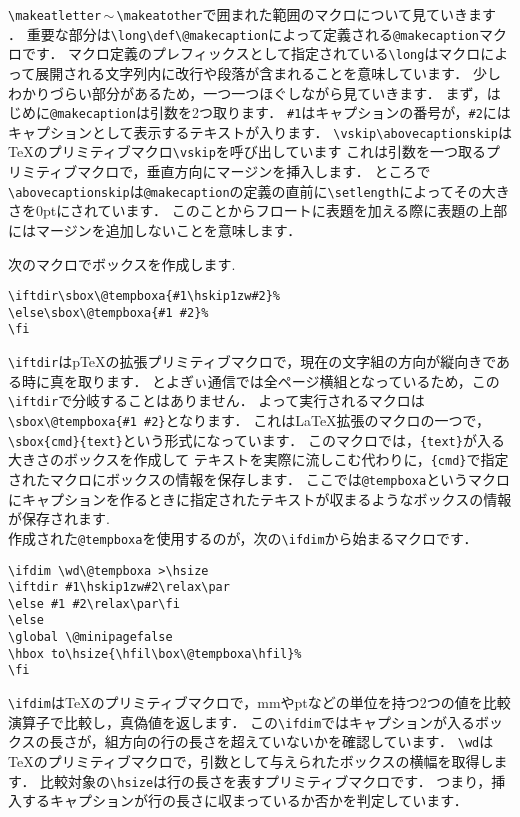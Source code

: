 \verb|\makeatletter|\,$\sim$\,\verb|\makeatother|で囲まれた範囲のマクロについて見ていきます
．
重要な部分は\verb|\long\def\@makecaption|によって定義される\verb|@makecaption|マクロです．
マクロ定義のプレフィックスとして指定されている\verb|\long|はマクロによって展開される文字列内に改行や段落が含まれることを意味しています．
少しわかりづらい部分があるため，一つ一つほぐしながら見ていきます．
まず，はじめに\verb|@makecaption|は引数を2つ取ります．
\verb|#1|はキャプションの番号が，\verb|#2|にはキャプションとして表示するテキストが入ります．
\verb|\vskip\abovecaptionskip|は{\TeX}のプリミティブマクロ\verb|\vskip|を呼び出しています
これは引数を一つ取るプリミティブマクロで，垂直方向にマージンを挿入します．
ところで\verb|\abovecaptionskip|は\verb|@makecaption|の定義の直前に\verb|\setlength|によってその大きさを0ptにされています．
このことからフロートに表題を加える際に表題の上部にはマージンを追加しないことを意味します．

次のマクロでボックスを作成します.
\begin{verbatim}
\iftdir\sbox\@tempboxa{#1\hskip1zw#2}%
\else\sbox\@tempboxa{#1 #2}%
\fi
\end{verbatim}%
\verb|\iftdir|は{p\TeX}の拡張プリミティブマクロで，現在の文字組の方向が縦向きである時に真を取ります．
とよぎぃ通信では全ページ横組となっているため，この\verb|\iftdir|で分岐することはありません．
よって実行されるマクロは\verb|\sbox\@tempboxa{#1 #2}|となります．
これは{\LaTeX}拡張のマクロの一つで，\verb|\sbox{cmd}{text}|という形式になっています．
このマクロでは，\verb|{text}|が入る大きさのボックスを作成して
テキストを実際に流しこむ代わりに，\verb|{cmd}|で指定されたマクロにボックスの情報を保存します．
ここでは\verb|@tempboxa|というマクロにキャプションを作るときに指定されたテキストが収まるようなボックスの情報が保存されます.\\
作成された\verb|@tempboxa|を使用するのが，次の\verb|\ifdim|から始まるマクロです．
\begin{verbatim}
\ifdim \wd\@tempboxa >\hsize
\iftdir #1\hskip1zw#2\relax\par
\else #1 #2\relax\par\fi
\else
\global \@minipagefalse
\hbox to\hsize{\hfil\box\@tempboxa\hfil}%
\fi
\end{verbatim}
\verb|\ifdim|は{\TeX}のプリミティブマクロで，mmやptなどの単位を持つ2つの値を比較演算子で比較し，真偽値を返します．
この\verb|\ifdim|ではキャプションが入るボックスの長さが，組方向の行の長さを超えていないかを確認しています．
\verb|\wd|は{\TeX}のプリミティブマクロで，引数として与えられたボックスの横幅を取得します．
比較対象の\verb|\hsize|は行の長さを表すプリミティブマクロです．
つまり，挿入するキャプションが行の長さに収まっているか否かを判定しています．


